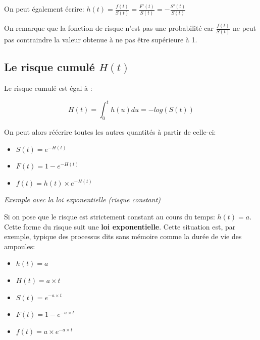 \documentclass[
  12pt,
  letterpaper,
  DIV=11,
  numbers=noendperiod,
  onepage,
  openany]{scrreprt}
\providecommand{\tightlist}{%
  \setlength{\itemsep}{0pt}\setlength{\parskip}{0pt}}\usepackage{longtable,booktabs,array}
\begin{document}
On peut également écrire:
\(h(t)=\frac{f(t)}{S(t)}=\frac{F'(t)}{S(t)}=-\frac{S'(t)}{S(t)}\)

On remarque que la fonction de risque n'est pas une probabilité car
\(\frac{f(t)}{S(t)}\) ne peut pas contraindre la valeur obtenue à ne pas
être supérieure à 1.

\hypertarget{le-risque-cumuluxe9-ht}{%
\subsection{\texorpdfstring{Le risque cumulé
\(H(t)\)}{Le risque cumulé H(t)}}\label{le-risque-cumuluxe9-ht}}

Le risque cumulé est égal à :

\[H(t)=\int_{0}^{t} h(u)du = -log(S(t))\]

On peut alors réécrire toutes les autres quantités à partir de celle-ci:

\begin{itemize}
\tightlist
\item
  \(S(t)=e^{-H(t)}\)\\
\item
  \(F(t)=1-e^{-H(t)}\)\\
\item
  \(f(t)=h(t)\times{e^{-H(t)}}\)
\end{itemize}

\emph{Exemple avec la loi exponentielle (risque constant)}

Si on pose que le risque est strictement constant au cours du temps:
\(h(t)=a\). Cette forme du risque suit une \textbf{loi exponentielle}.
Cette situation est, par exemple, typique des processus dits sans
mémoire comme la durée de vie des ampoules:

\begin{itemize}
\tightlist
\item
  \(h(t)=a\)\\
\item
  \(H(t)=a\times{t}\)\\
\item
  \(S(t)=e^{-a\times{t}}\)\\
\item
  \(F(t)=1-e^{-a\times{t}}\)\\
\item
  \(f(t)=a\times{e^{-a\times{t}}}\)
\end{itemize}
\end{document}
